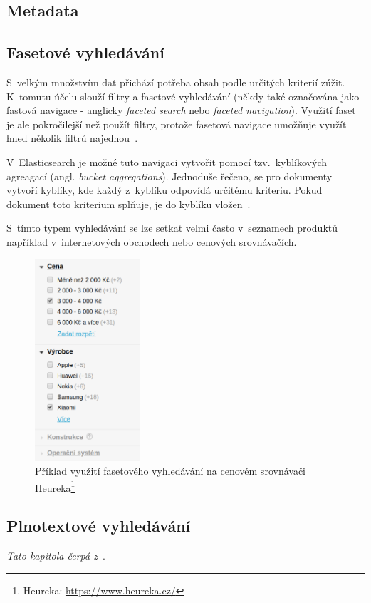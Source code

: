 \subsection{Metadata}
\blindtext

\subsection{Fasetové vyhledávání}
S~velkým množstvím dat přichází potřeba obsah podle určitých kriterií zúžit. K~tomutu účelu slouží filtry a fasetové vyhledávání (někdy také označována jako fastová navigace - anglicky \emph{faceted search} nebo \emph{faceted navigation}). Využití faset je ale pokročilejší než použít filtry, protože fasetová navigace umožňuje využít hned několik filtrů najednou~\cite{bib:facet}.

V~Elasticsearch je možné tuto navigaci vytvořit pomocí tzv.~kyblíkových agreagací (angl. \emph{bucket aggregations}).
Jednoduše řečeno, se pro dokumenty vytvoří kyblíky, kde každý z~kyblíku odpovídá určitému kriteriu. Pokud dokument toto kriterium splňuje, je do kyblíku vložen~\cite{bib:elastic-bucket}.

S~tímto typem vyhledávání se lze setkat velmi často v~seznamech produktů například v~internetových obchodech nebo cenových srovnávačích.

\begin{figure}[H]
	\centering
	\includegraphics[width=0.35\textwidth]{obrazky-figures/heureka-facet.png}
	\caption{Příklad využití fasetového vyhledávání na cenovém srovnávači Heureka\protect\footnote{Heureka: \url{https://www.heureka.cz/}}}
\end{figure}


\subsection{Plnotextové vyhledávání}
\emph{Tato kapitola čerpá z~\cite{bib:elastic-defnitive}}.

